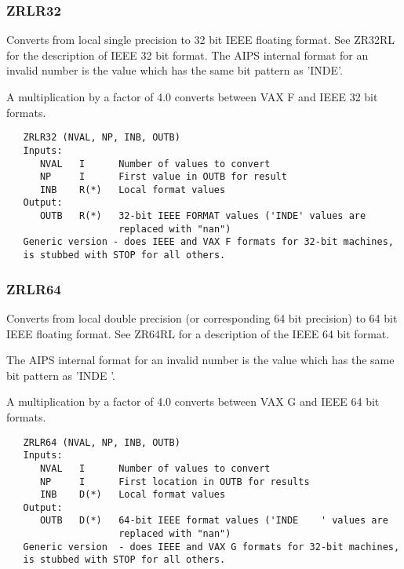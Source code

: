 \subsubsection{ZRLR32}
Converts from local single precision to 32 bit IEEE floating format.
See ZR32RL for the description of IEEE 32 bit format.
The AIPS internal format for an invalid number is the value which
has the same bit pattern as 'INDE'.

A multiplication by a factor of 4.0 converts between VAX F and IEEE
32 bit formats.
\begin{verbatim}
   ZRLR32 (NVAL, NP, INB, OUTB)
   Inputs:
      NVAL   I      Number of values to convert
      NP     I      First value in OUTB for result
      INB    R(*)   Local format values
   Output:
      OUTB   R(*)   32-bit IEEE FORMAT values ('INDE' values are
                    replaced with "nan")
   Generic version - does IEEE and VAX F formats for 32-bit machines,
   is stubbed with STOP for all others.
\end{verbatim}

\subsubsection{ZRLR64}
Converts from local double precision (or corresponding 64 bit
precision) to 64 bit IEEE floating format.  See ZR64RL for a
description of the IEEE 64 bit format.

The AIPS internal format for an invalid number is the value which
has the same bit pattern as 'INDE    '.

A multiplication by a factor of 4.0 converts between VAX G and IEEE
64 bit formats.
\begin{verbatim}
   ZRLR64 (NVAL, NP, INB, OUTB)
   Inputs:
      NVAL   I      Number of values to convert
      NP     I      First location in OUTB for results
      INB    D(*)   Local format values
   Output:
      OUTB   D(*)   64-bit IEEE format values ('INDE    ' values are
                    replaced with "nan")
   Generic version  - does IEEE and VAX G formats for 32-bit machines,
   is stubbed with STOP for all others.
\end{verbatim}

